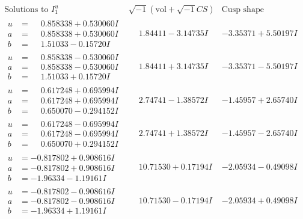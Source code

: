 \documentclass[1p]{elsarticle_modified}
\theoremstyle{definition}
\newcommand{\I}{\sqrt{-1}}
\begin{document}
$$\begin{array}{c|c|c}  
\text{Solutions to }I^u_{1}& \I (\text{vol} + \sqrt{-1}CS) & \text{Cusp shape}\\
 \hline 
\begin{aligned}
u &= \phantom{-}0.858338 + 0.530060 I \\
a &= \phantom{-}0.858338 + 0.530060 I \\
b &= \phantom{-}1.51033 - 0.15720 I\end{aligned}
 & \phantom{-}1.84411 - 3.14735 I & -3.35371 + 5.50197 I \\ \hline\begin{aligned}
u &= \phantom{-}0.858338 - 0.530060 I \\
a &= \phantom{-}0.858338 - 0.530060 I \\
b &= \phantom{-}1.51033 + 0.15720 I\end{aligned}
 & \phantom{-}1.84411 + 3.14735 I & -3.35371 - 5.50197 I \\ \hline\begin{aligned}
u &= \phantom{-}0.617248 + 0.695994 I \\
a &= \phantom{-}0.617248 + 0.695994 I \\
b &= \phantom{-}0.650070 - 0.294152 I\end{aligned}
 & \phantom{-}2.74741 - 1.38572 I & -1.45957 + 2.65740 I \\ \hline\begin{aligned}
u &= \phantom{-}0.617248 - 0.695994 I \\
a &= \phantom{-}0.617248 - 0.695994 I \\
b &= \phantom{-}0.650070 + 0.294152 I\end{aligned}
 & \phantom{-}2.74741 + 1.38572 I & -1.45957 - 2.65740 I \\ \hline\begin{aligned}
u &= -0.817802 + 0.908616 I \\
a &= -0.817802 + 0.908616 I \\
b &= -1.96334 - 1.19161 I\end{aligned}
 & \phantom{-}10.71530 + 0.17194 I & -2.05934 - 0.49098 I \\ \hline\begin{aligned}
u &= -0.817802 - 0.908616 I \\
a &= -0.817802 - 0.908616 I \\
b &= -1.96334 + 1.19161 I\end{aligned}
 & \phantom{-}10.71530 - 0.17194 I & -2.05934 + 0.49098 I \\ \hline\begin{aligned}

\end{aligned}
\end{array}$$
\end{document}
